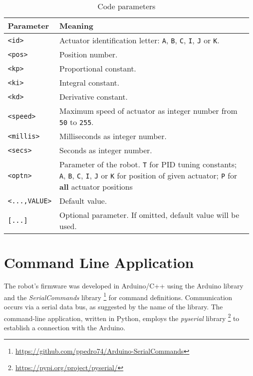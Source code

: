 \begingroup
\setlength{\tabcolsep}{10pt}
\renewcommand{\arraystretch}{1.5}
\begin{table}[H]
    \centering
    \caption{Code parameters}
    \label{tab:code-parameters}
    \begin{tabular}{p{}p{}}
    \toprule
    Parameter & Meaning \\ \midrule
    \texttt{<id>} & Actuator identification letter: \texttt{A}, \texttt{B}, \texttt{C}, \texttt{I}, \texttt{J} or \texttt{K}. \\
    \texttt{<pos>} & Position number. \\
    \texttt{<kp>} & Proportional constant. \\
    \texttt{<ki>} & Integral constant. \\
    \texttt{<kd>} & Derivative constant. \\
    \texttt{<speed>} & Maximum speed of actuator as integer number from \texttt{50} to \texttt{255}. \\
    \texttt{<millis>} & Milliseconds as integer number. \\
    \texttt{<secs>} & Seconds as integer number. \\
    \texttt{<optn>} & Parameter of the robot. \texttt{T} for PID tuning constants; \texttt{A}, \texttt{B}, \texttt{C}, \texttt{I}, \texttt{J} or \texttt{K} for position of given actuator; \texttt{P} for \textbf{all} actuator positions\\
    \texttt{<...,VALUE>} & Default value. \\
    \texttt{[...]} & Optional parameter. If omitted, default value will be used. \\
    \bottomrule
    \end{tabular}
\end{table}
\endgroup

\section{Command Line Application}

The robot's firmware was developed in Arduino/C++ using the Arduino library and the \textit{SerialCommands} library \footnote{\url{https://github.com/ppedro74/Arduino-SerialCommands}} for command definitions. Communication occurs via a serial data bus, as suggested by the name of the library. The command-line application, written in Python, employs the \textit{pyserial} library \footnote{\url{https://pypi.org/project/pyserial/}} to establish a connection with the Arduino.


